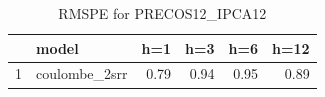 \begin{table}[ht]
\centering
\begin{tabular}{rlrrrr}
  \hline
 & model & h=1 & h=3 & h=6 & h=12 \\ 
  \hline
1 & coulombe\_2srr & 0.79 & 0.94 & 0.95 & 0.89 \\ 
   \hline
\end{tabular}
\caption{RMSPE for PRECOS12_IPCA12} 
\end{table}

